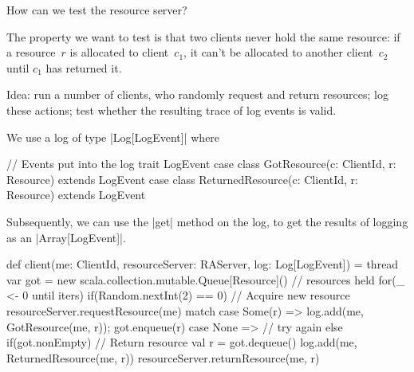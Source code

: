 
\begin{slide}

How can we test the resource server?  

The property we want to test is that two clients never hold the same resource:
if a resource~$r$ is allocated to client~$c_1$, it can't be allocated to
another client~$c_2$ until $c_1$ has returned it.

Idea: run a number of clients, who randomly request and return resources; log
these actions; test whether the resulting trace of log events is valid.
\end{slide}


\begin{slide}

We use a log of type |Log[LogEvent]| where
\begin{scala}
  // Events put into the log
  trait LogEvent
  case class GotResource(c: ClientId, r: Resource) extends LogEvent
  case class ReturnedResource(c: ClientId, r: Resource) extends LogEvent
\end{scala}

Subsequently, we can use the |get| method on the log, to get the
results of logging as an |Array[LogEvent]|.  
\end{slide}


\begin{slide}

\begin{scala}
  def client(me: ClientId, resourceServer: RAServer, log: Log[LogEvent]) = thread{
    var got = new scala.collection.mutable.Queue[Resource]() // resources held
    for(_ <- 0 until iters){
      if(Random.nextInt(2) == 0){        // Acquire new resource
	resourceServer.requestResource(me) match{
          case Some(r) =>  log.add(me, GotResource(me, r)); got.enqueue(r)
          case None => {}  // try again
        }
      }
      else if(got.nonEmpty){    	// Return resource
	val r = got.dequeue()
        log.add(me, ReturnedResource(me, r))
	resourceServer.returnResource(me, r)
      }
    }
  }
\end{scala}
\end{slide}  


